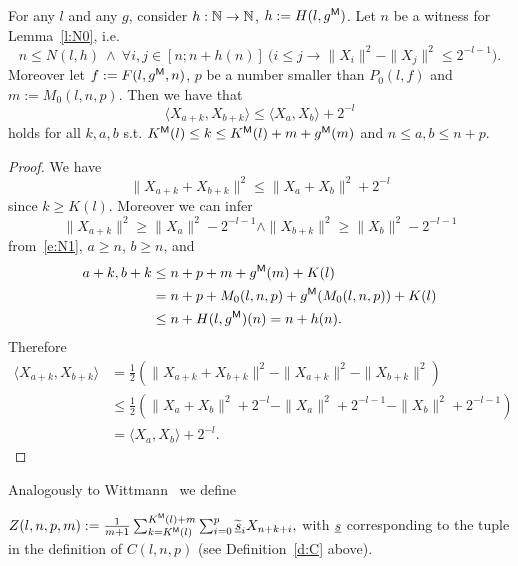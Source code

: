 \begin{lemma}\label{l:scpb}
For any $l$ and any $g$, consider $h:\mathbb{N}\to\mathbb{N}$, $h:=H(l,g\protect{^{\textsf{\upshape M}}})$. Let
$n$ be a witness for Lemma~\ref{l:N0}, i.e. 
\[
n\leq N(l,h)\ \wedge\ \forall i,j\in[n;n+h(n)]\ 
\big( i\leq j\rightarrow \|X_i\|^2-\|X_j\|^2\leq 2^{-l-1} \big) . \tag{N}\label{e:N1}
\]
Moreover let $f:=F(l,g\protect{^{\textsf{\upshape M}}},n)$,
$p$ be a number smaller than $P_0(l,f)$ 
and  $m:=M_0(l,n,p)$. Then we have that
\[ 
\langle X_{a+k},X_{b+k} \rangle \leq \langle X_{a},X_{b} \rangle + 2^{-l}
\]
holds for all $k,a,b$ s.t. $K\protect{^{\textsf{\upshape M}}}(l)\leq k \leq K\protect{^{\textsf{\upshape M}}}(l)+m+g\protect{^{\textsf{\upshape M}}}(m)$ and $ n\leq a,b \leq n+p$.
\end{lemma}
\begin{proof}
We have
\[
\|X_{a+k}+X_{b+k}\|^2 \leq \|X_{a}+X_{b}\|^2 + 2^{-l} \tag{1}\label{e:sc1}
\] since $k\geq K(l)$. Moreover we can infer
\[
\|X_{a+k}\|^2 \geq \|X_{a}\|^2 - 2^{-l-1} \wedge \|X_{b+k}\|^2 \geq \|X_{b}\|^2 - 2^{-l-1} \tag{2}\label{e:sc2}
\] from~\eqref{e:N1}, $a\geq n$, $b \geq n$, and 
\begin{align*}
 a+k,b+k &\leq n+p+m+g\protect{^{\textsf{\upshape M}}}(m)+K(l) \\
 &= n+p+M_0(l,n,p)+g\protect{^{\textsf{\upshape M}}}(M_0(l,n,p))+K(l) \\
 &\leq n+H(l,g\protect{^{\textsf{\upshape M}}})(n) = n+h(n). 
\end{align*}
Therefore
\begin{align*}
\langle X_{a+k},X_{b+k} \rangle &= \frac{1}{2}( \|X_{a+k}+X_{b+k}\|^2 - \|X_{a+k}\|^2 - \|X_{b+k}\|^2 )\\
&\leq \frac{1}{2}( \|X_{a}+X_{b}\|^2 + 2^{-l} - \|X_{a}\|^2 + 2^{-l-1} - \|X_{b}\|^2  + 2^{-l-1})\\
&= \langle X_{a},X_{b} \rangle + 2^{-l}.
\end{align*}
\end{proof}

Analogously to Wittmann~\cite{Wittmann90} we define
\begin{dfn}[$Z$]\label{d:Z}
$Z(l,n,p,m):=\frac{1}{m+1}\sum^{K\protect{^{\textsf{\upshape M}}}(l)+m}_{k=K\protect{^{\textsf{\upshape M}}}(l)}\sum^{p}_{i=0}  \widetilde{\underline s}_i X_{n+k+i},$
with $\underline s$ corresponding to the tuple in the definition of $C(l,n,p)$ (see
Definition~\ref{d:C} above). 
\end{dfn}

